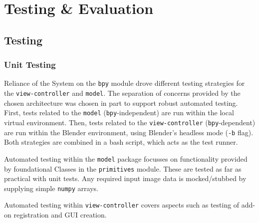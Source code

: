 


\chapter{Testing \& Evaluation}\label{testing_evaluation}

\section{Testing}

\subsection{Unit Testing}

Reliance of the System on the \texttt{bpy} module drove different testing strategies for the \texttt{view-controller} and \texttt{model}.
The separation of concerns provided by the chosen architecture was chosen in part to support robust automated testing.
First, tests related to the \texttt{model} (\texttt{bpy}-independent) are run within the local virtual environment.
Then, tests related to  the \texttt{view-controller} (\texttt{bpy}-dependent) are run within the Blender environment, using Blender's headless mode (\texttt{-b} flag).
Both strategies are combined in a bash script, which acts as the test runner.



Automated testing within the \texttt{model} package focusses on functionality provided by foundational Classes in the \texttt{primitives} module.
These are tested as far as practical with unit tests. 
Any required input image data is mocked/stubbed by supplying simple \texttt{numpy} arrays.

Automated testing within \texttt{view-controller} covers aspects such as testing of add-on registration and GUI creation.

